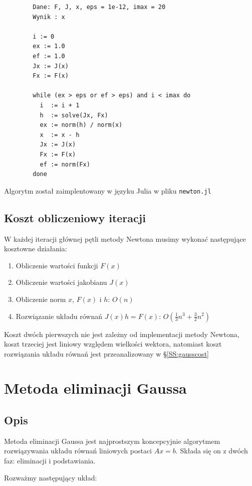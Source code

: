\documentclass[11pt,wide]{mwart}
\begin{document}
\begin{verbatim}
		Dane: F, J, x, eps = 1e-12, imax = 20
		Wynik : x
		
		i := 0
		ex := 1.0
		ef := 1.0
		Jx := J(x)
	    Fx := F(x)
	    
		while (ex > eps or ef > eps) and i < imax do
		  i  := i + 1
		  h  := solve(Jx, Fx)
		  ex := norm(h) / norm(x)
		  x  := x - h
		  Jx := J(x)
		  Fx := F(x)
		  ef := norm(Fx)
		done			
\end{verbatim}

Algorytm został zaimplentowany w języku Julia w pliku \texttt{newton.jl}

\subsection{Koszt obliczeniowy iteracji}

W każdej iteracji głównej pętli metody Newtona musimy wykonać następujące kosztowne działania:

\begin{enumerate}
\item Obliczenie wartości funkcji $ F(x) $
\item Obliczenie wartości jakobianu $ J(x) $
\item Obliczenie norm $ x $, $ F(x) $ i $ h $: \quad $ O(n) $
\item Rozwiązanie układu równań $ J(x)h = F(x)$: \quad  $ O(\frac{1}{3}n^3 + \frac{3}{2}n^2) $
\end{enumerate}

Koszt dwóch pierwszych nie jest zależny od implementacji metody Newtona, koszt trzeciej jest liniowy względem wielkości wektora, natomiast koszt rozwiązania układu równań jest przeanalizowany w \S \ref{SS:gausscost}

\section{Metoda eliminacji Gaussa}

\subsection{Opis} \label{p:gaussopis}

Metoda eliminacji Gaussa jest najprostszym koncepcyjnie algorytmem rozwiązywania układu równań liniowych postaci $ Ax = b $.
Składa się on z dwóch faz: eliminacji i podstawiania.

Rozważmy następujący układ:
\end{document}

